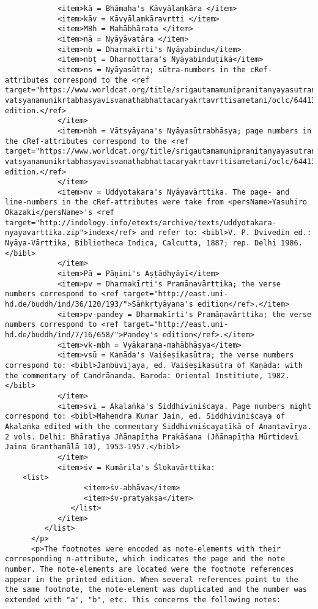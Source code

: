 \documentclass[article,12pt,a4paper]{memoir}
\begin{document}
\begin{verbatim}
            <item>kā = Bhāmaha's Kāvyālaṃkāra </item>
            <item>kāv = Kāvyālaṃkāravṛtti </item>
            <item>MBh = Mahābhārata </item>
            <item>nā = Nyāyāvatāra </item>
            <item>nb = Dharmakīrti's Nyāyabindu</item>
            <item>nbṭ = Dharmottara's Nyāyabinduṭīkā</item>
            <item>ns = Nyāyasūtra; sūtra-numbers in the cRef-attributes correspond to the <ref target="https://www.worldcat.org/title/srigautamamunipranitanyayasutrani-vatsyanamunikrtabhasyavisvanathabhattacaryakrtavrttisametani/oclc/644135949">1922 edition.</ref>
            </item>
            <item>nbh = Vātsyāyana's Nyāyasūtrabhāṣya; page numbers in the cRef-attributes correspond to the <ref target="https://www.worldcat.org/title/srigautamamunipranitanyayasutrani-vatsyanamunikrtabhasyavisvanathabhattacaryakrtavrttisametani/oclc/644135949">1922 edition.</ref>
            </item>
            <item>nv = Uddyotakara's Nyāyavārttika. The page- and line-numbers in the cRef-attributes were take from <persName>Yasuhiro Okazaki</persName>'s <ref target="http://indology.info/etexts/archive/texts/uddyotakara-nyayavarttika.zip">index</ref> and refer to: <bibl>V. P. Dvivedin ed.: Nyāya-Vārttika, Bibliotheca Indica, Calcutta, 1887; rep. Delhi 1986.</bibl>
            </item>
            <item>Pā = Pāṇini's Aṣṭādhyāyī</item>
            <item>pv = Dharmakīrti's Pramāṇavārttika; the verse numbers correspond to <ref target="http://east.uni-hd.de/buddh/ind/36/120/193/">Sāṅkṛtyāyana's edition</ref>.</item>
            <item>pv-pandey = Dharmakīrti's Pramāṇavārttika; the verse numbers correspond to <ref target="http://east.uni-hd.de/buddh/ind/7/16/658/">Pandey's edition</ref>.</item>
            <item>vk-mbh = Vyākaraṇa-mahābhāṣya</item>
            <item>vsū = Kaṇāda's Vaiśeṣikasūtra; the verse numbers correspond to: <bibl>Jambūvijaya, ed. Vaiśeṣikasūtra of Kaṇāda: with the commentary of Candrānanda. Baroda: Oriental Institiute, 1982.</bibl>
            </item>
            <item>svi = Akalaṅka's Siddhiviniścaya. Page numbers might correspond to: <bibl>Mahendra Kumar Jain, ed. Siddhiviniścaya of Akalaṅka edited with the commentary Siddhivniścayaṭīkā of Anantavīrya. 2 vols. Delhi: Bhāratīya Jñānapīṭha Prakāśana (Jñānapīṭha Mūrtidevī Jaina Granthamālā 10), 1953-1957.</bibl>
            </item>
            <item>śv = Kumārila's Ślokavārttika:
	<list>
                  <item>śv-abhāva</item>
                  <item>śv-pratyakṣa</item>
               </list>
            </item>
         </list>
      </p>
      <p>The footnotes were encoded as note-elements with their corresponding n-attribute, which indicates the page and the note number. The note-elements are located were the footnote references appear in the printed edition. When several references point to the the same footnote, the note-element was duplicated and the number was extended with "a", "b", etc. This concerns the following notes: 

\end{verbatim}
\end{document}
